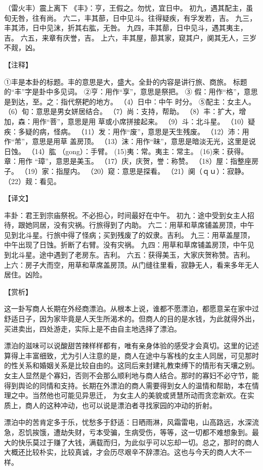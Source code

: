 \documentclass[12pt,UTF8]{ctexbook}
\begin{document}
（雷火丰）震上离下
《丰》：亨，王假之。勿忧，宜日中。
初九，遇其配主，虽旬无咎，往有尚。
六二，丰其蔀，日中见斗。往得疑疾，有孚发若，吉。
九三，丰其沛，日中见沫，折其右肱，无咎。
九四，丰其蔀，日中见斗，遇其夷主，吉。
六五，来章有庆誉，吉。
上六，丰其屋，蔀其家，窥其户，阒其无人，三岁不觌，凶。

【注释】

①丰是本卦的标题。丰的意思是大，盛大。全卦的内容是讲行旅、商旅。 标题的“丰”字是卦中多见词。
②亨：用作“享”，意思是祭把。
③ 假：用作“格”，意思是到达，至。之：指代祭耙的地方。
（4）日中：中午 时分。
⑤配主：女主人。
（6）旬：意思是男女姘居结合。
（7）尚：支持，帮助。
（8）丰：扩大，增加，森：用作“菩”，意思是用 草或小席拼接起来。
（9）斗：北斗星。
（10）疑疾：多疑的病，怪病。
（11）发：用作“废”，意思是天生残废。
（12）沛：用作“芾”，意思是用草 盖房顶。
（13）沫：用作“昧”，意思是暗淡无光，这里是说日蚀。
（14）肱 （gong）：手臂。
(15)夷：常。夷主：常主。
(16)来：获得。章：用作 “璋”，意思是美玉。
（17）庆，庆贺，誉：称赞。
（18）屋：指整座房子。
（19）家：指屋内。
（20）窥：意思是探看。
（21）阒（ｑｕ）：寂静。
（22）觌：看见。

【译文】

丰卦：君王到宗庙祭祝。不必担心，时间最好在中午。
初九：途中受到女主人招待，跟她同居，没有灾祸。行旅得到了内助。
六二：用草和草席铺盖房顶，中午见到北斗星。行旅中得了怪病；买到残废了的奴隶。吉利。
九三：用草盖屋顶，中午出现了日蚀。折断了右臂。没有灾祸。
九四：用草和草席铺盖房顶，中午见到北斗星。途中遇到了老房东。吉利。
六五：获得美玉，大家庆贺称赞。吉利。
上六：房子大而空，用草和草席盖房顶。从门缝往里看，寂静无人，看来多年无人居住。凶险。

【赏析】

这一卦写商人长期在外经商漂泊。从根本上说，谁都不愿漂泊，都愿意呆在家中过舒适日子，因为家毕竟是人天生所渴术的。但商人的目的是水钱，为此就得外出，买进卖出，四处游走，实际上是不由自主地选择了漂泊。

漂泊的滋味可以说酸甜苦辣样样都有，唯有亲身体验的感受才会真切。这里的记述算得上丰富细致，尤为引人注意的是，商人在途中与客栈的女主人同居，可见那时的性关系和婚姻关系是比较自由的。这同后来封建礼教束缚下的情形有天壤之别。女主人显然是个寡妇，否则不会那么顺利地与商人结合。那时的寡妇不必守节，能得到舆论的同情和支持。长期在外漂泊的商人需要得到女人的温情和帮助，本在情理之中。当然他也可能见异思迁， 为女主人的美貌或贤慧所动而贪恋新欢。在实质上，商人的这种冲动，也可以说是漂泊者寻找家园的冲动的折射。

漂泊中的苦肯定多于乐，忧愁多于舒适：日晒雨淋，风霜雷电，山高路远，水深流急，忍饥挨饿，遭劫失财，亏本受骗，生病受伤，等等，这一切都不难想象到。最大的快乐莫过于赚了大钱，满载而归，为此似乎可以忘却一切。总之，那时的商人大概还比较朴实，比较真诚，才会历尽艰辛不辞漂泊。这也与今天的商人大不一样。
\end{document}
